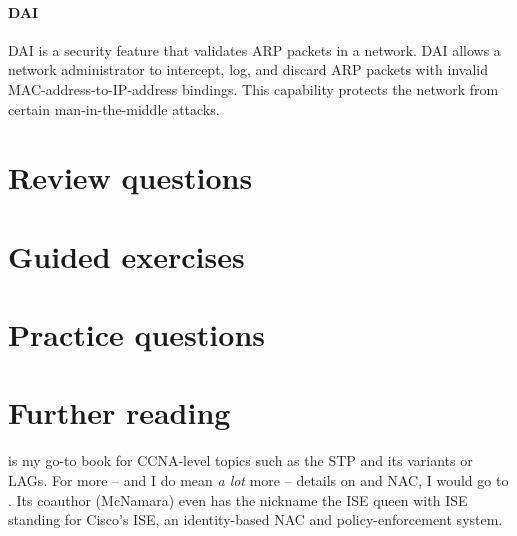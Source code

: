 \paragraph{\acl{DAI}}
\Acf{DAI} is a security feature that validates \acs{ARP} packets in a network.
\Acl{DAI} allows a network administrator to intercept, log, and discard \ac{ARP} packets with invalid \acs{MAC}-address-to-\acs{IP}-address bindings.
This capability protects the network from certain man-in-the-middle attacks.


\section{Review questions}

\section{Guided exercises}

\section{Practice questions}

\section{Further reading}
\textcite{lammle-ccna} is my go-to book for \acs{CCNA}-level topics such as the \acf{STP} and its variants or \acfp{LAG}.
For more -- and I do mean \emph{a lot} more -- details on  and \acf{NAC}, I would go to \textcite{woland}.
Its coauthor (McNamara) even has the nickname the \acs{ISE} queen with \acs{ISE} standing for Cisco's \acl{ISE}, an identity-based \acs{NAC} and policy-enforcement system.

